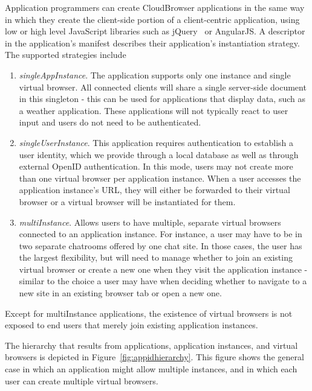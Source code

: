 Application programmers can create CloudBrowser applications in the same way in which
they create the client-side portion of a client-centric application, using low or high level
JavaScript libraries such as jQuery~\cite{jquery} or AngularJS.  
A descriptor in the application's manifest describes 
their application's instantiation strategy.
The supported strategies include

\begin{enumerate}
\item \emph{singleAppInstance}. The application supports only one instance and single virtual browser.
    All connected clients will share a single server-side document in this singleton - this can be
    used for applications that display data, such as a weather application. These applications will not
    typically react to user input and users do not need to be authenticated.

\item \emph{singleUserInstance}.  This application requires authentication to establish a
    user identity, which we provide through a local database as well as through external OpenID
    authentication.   In this mode, users may not create more than one virtual browser per
    application instance.  When a user accesses the application instance's URL, they will either
    be forwarded to their virtual browser or a virtual browser will be instantiated for them.

\item \emph{multiInstance}.
    Allows users to have multiple, separate virtual browsers connected to an application
    instance. For instance, a user may have to be in two separate chatrooms offered by one chat site.
    In those cases, the user has the largest flexibility, but will need to manage whether
    to join an existing virtual browser or create a new one when they visit the application instance
    - similar to the choice a user may have when deciding whether to navigate to a new site in
    an existing browser tab or open a new one.
\end{enumerate}
Except for multiInstance applications, the existence of virtual browsers is not exposed to
end users that merely join existing application instances.

\apphierarchyfig{}

The hierarchy that results from applications, application instances, and virtual browsers is
depicted in Figure~\ref{fig:appidhierarchy}.  This figure shows the general case in which an
application might allow multiple instances, and in which each user can create multiple virtual
browsers.


